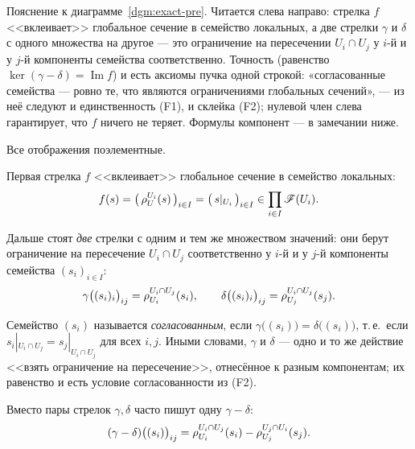 Пояснение к диаграмме~\ref{dgm:exact-pre}. Читается слева
направо: стрелка $f$ <<вклеивает>> глобальное сечение в семейство
локальных, а две стрелки $\gamma$ и $\delta$ с одного множества
на другое --- это ограничение на пересечении $U_i\cap U_j$
у $i$-й и у $j$-й компоненты семейства соответственно. Точность
(равенство $\ker(\gamma-\delta)=\operatorname{Im}f$) и есть
аксиомы пучка одной строкой: «согласованные семейства --- ровно
те, что являются ограничениями глобальных сечений», --- из
неё следуют и единственность (F1), и склейка (F2); нулевой член
слева гарантирует, что $f$ ничего не теряет. Формулы компонент
--- в замечании ниже.

\begin{rem}\label{rem:gd}
Все отображения поэлементные.
\begin{conditions}
\item Первая стрелка $f$ <<вклеивает>> глобальное сечение в семейство
 локальных:
 \begin{equation}\label{eq:f}
  f(s)=\bigl(\,\rho^{U_i}_{U}(s)\,\bigr)_{i\in I}
  =\bigl(\,s|_{U_i}\,\bigr)_{i\in I}
  \in\prod_{i\in I}\mathscr{F}(U_i).
 \end{equation}
\item Дальше стоят \emph{две} стрелки с одним и тем же множеством
 значений: они берут ограничение на пересечение $U_i\cap U_j$
 соответственно у $i$-й и у $j$-й компоненты семейства
 $(s_i)_{i\in I}$:
 \begin{equation}\label{eq:gd}
  \gamma\bigl((s_i)_i\bigr)_{ij}=\rho^{U_i\cap U_j}_{U_i}(s_i),
  \qquad
  \delta\bigl((s_i)_i\bigr)_{ij}=\rho^{U_i\cap U_j}_{U_j}(s_j).
 \end{equation}
\item Семейство $(s_i)$ называется \emph{согласованным}, если
 $\gamma\bigl((s_i)\bigr)=\delta\bigl((s_i)\bigr)$, т.\,е.\ если
 $s_i|_{U_i\cap U_j}=s_j|_{U_i\cap U_j}$ для всех $i,j$. Иными словами,
 $\gamma$ и $\delta$ --- одно и то же действие <<взять ограничение на
 пересечение>>, отнесённое к разным компонентам; их равенство и есть
 условие согласованности из (F2).
\end{conditions}
Вместо пары стрелок $\gamma,\delta$ часто пишут одну $\gamma-\delta$:
\begin{equation}\label{eq:gmd}
 (\gamma-\delta)\bigl((s_i)\bigr)_{ij}
 =\rho^{U_i\cap U_j}_{U_i}(s_i)-\rho^{U_j\cap U_i}_{U_j}(s_j).
\end{equation}
\end{rem}

